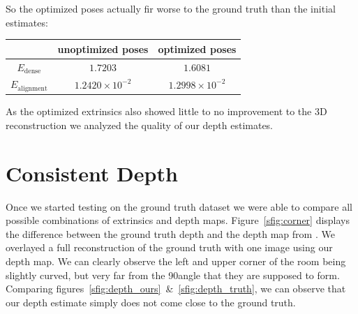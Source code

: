         So the optimized poses actually fir worse to the ground truth than the initial estimates:
        \begin{center}
            \begin{tabular}[]{c | c | c}
                & unoptimized poses & optimized poses\\
                \hline
                $E_{\text{dense}}$ & $1.7203$ & $1.6081$\\
                \hline
                $E_{\text{alignment}}$ & $1.2420\times10^{-2}$ & $1.2998\times10^{-2}$
            \end{tabular}
        \end{center}
        As the optimized extrinsics also showed little to no improvement to the 3D reconstruction we analyzed the quality of our depth estimates.
    \section{Consistent Depth}
        Once we started testing on the ground truth dataset we were able to compare all possible combinations of extrinsics and depth maps.
        Figure~\ref{sfig:corner} displays the difference between the ground truth depth and the depth map from .
        We overlayed a full reconstruction of the ground truth with one image using our depth map.
        We can clearly observe the left and upper corner of the room being slightly curved, but very far from the 90\textdegree angle that they are supposed to form.
        Comparing figures~\ref{sfig:depth_ours}~\&~\ref{sfig:depth_truth}, we can observe that our depth estimate simply does not come close to the ground truth.\\
